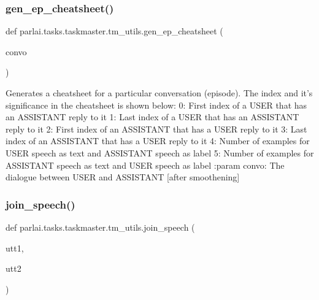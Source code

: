 \subsubsection{\texorpdfstring{gen\+\_\+ep\+\_\+cheatsheet()}{gen\_ep\_cheatsheet()}}
{\footnotesize\ttfamily def parlai.\+tasks.\+taskmaster.\+tm\+\_\+utils.\+gen\+\_\+ep\+\_\+cheatsheet (\begin{DoxyParamCaption}\item[{}]{convo }\end{DoxyParamCaption})}

\begin{DoxyVerb}Generates a cheatsheet for a particular conversation (episode).
The index and it's significance in the cheatsheet is shown below:
    0: First index of a USER that has an ASSISTANT reply to it
    1: Last index of a USER that has an ASSISTANT reply to it
    2: First index of an ASSISTANT that has a USER reply to it
    3: Last index of an ASSISTANT that has a USER reply to it
    4: Number of examples for USER speech  as text and ASSISTANT speech as label
    5: Number of examples for ASSISTANT speech as text and USER speech  as label
:param convo:
    The dialogue between USER and ASSISTANT [after smoothening]
\end{DoxyVerb}
 \mbox{\label{namespaceparlai_1_1tasks_1_1taskmaster_1_1tm__utils_ad5d13cd462bd26919f078aa93174e9cd}} 
\subsubsection{\texorpdfstring{join\+\_\+speech()}{join\_speech()}}
{\footnotesize\ttfamily def parlai.\+tasks.\+taskmaster.\+tm\+\_\+utils.\+join\+\_\+speech (\begin{DoxyParamCaption}\item[{}]{utt1,  }\item[{}]{utt2 }\end{DoxyParamCaption})}

